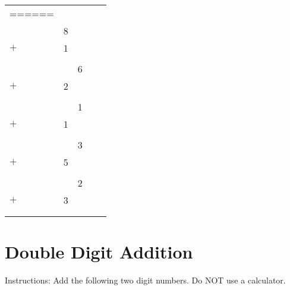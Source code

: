 \documentclass{article}
\begin{document}
\begin{tabularx}{\textwidth}{XXXXX}
	\vspace{0.1in}
	====== \\

	\begin{tabular}{lS}
		&8 \\
		$+$&1 \\
		\hline 
		& \\
	\end{tabular}

	&\begin{tabular}{lS}
		&6 \\
		$+$&2 \\
		\hline 
		& \\
	\end{tabular}

	&\begin{tabular}{lS}
		&1 \\
		$+$&1 \\
		\hline 
		& \\
	\end{tabular}

	&\begin{tabular}{lS}
		&3 \\
		$+$&5 \\
		\hline 
		& \\
	\end{tabular}

	&\begin{tabular}{lS}
		&2 \\
		$+$&3 \\
		\hline 
		& \\
	\end{tabular}
\end{tabularx}

\section{Double Digit Addition}
Instructions: Add the following two digit numbers. Do NOT use a calculator.

\vspace{0.3in}
\end{document}
